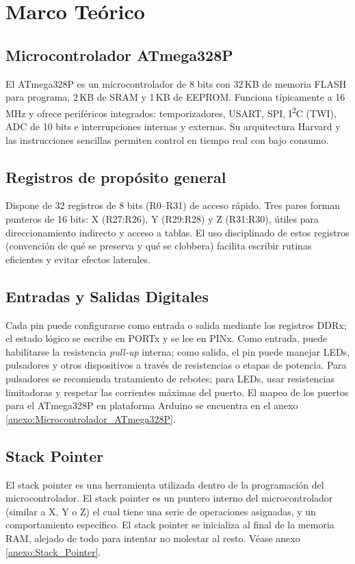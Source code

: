 \section{Marco Teórico}

\subsection{Microcontrolador ATmega328P}
El ATmega328P es un microcontrolador de 8 bits con 32\,KB de memoria FLASH para programa, 2\,KB de SRAM y 1\,KB de EEPROM. Funciona típicamente a 16\,MHz y ofrece periféricos integrados: temporizadores, USART, SPI, I\textsuperscript{2}C (TWI), ADC de 10 bits e interrupciones internas y externas. Su arquitectura Harvard y las instrucciones sencillas permiten control en tiempo real con bajo consumo. 

\subsection{Registros de propósito general}
Dispone de 32 registros de 8 bits (R0–R31) de acceso rápido. Tres pares forman punteros de 16 bits: X (R27:R26), Y (R29:R28) y Z (R31:R30), útiles para direccionamiento indirecto y acceso a tablas. El uso disciplinado de estos registros (convención de qué se preserva y qué se clobbera) facilita escribir rutinas eficientes y evitar efectos laterales.

\subsection{Entradas y Salidas Digitales}
Cada pin puede configurarse como entrada o salida mediante los registros DDRx; el estado lógico se escribe en PORTx y se lee en PINx. Como entrada, puede habilitarse la resistencia \textit{pull-up} interna; como salida, el pin puede manejar LEDs, pulsadores y otros dispositivos a través de resistencias o etapas de potencia. Para pulsadores se recomienda tratamiento de rebotes; para LEDs, usar resistencias limitadoras y respetar las corrientes máximas del puerto. El mapeo de los puertos para el ATmega328P en plataforma Arduino se encuentra en el anexo \ref{anexo:Microcontrolador_ATmega328P}.

\newpage

\subsection{Stack Pointer}
El stack pointer es una herramienta utilizada dentro de la programación del microcontrolador. El stack pointer es un puntero interno del microcontrolador (similar a X, Y o Z) el cual tiene una serie de operaciones asignadas, y un comportamiento específico. El stack pointer se inicializa al final de la memoria RAM, alejado de todo para intentar no molestar al resto. Véase anexo \ref{anexo:Stack_Pointer}.

